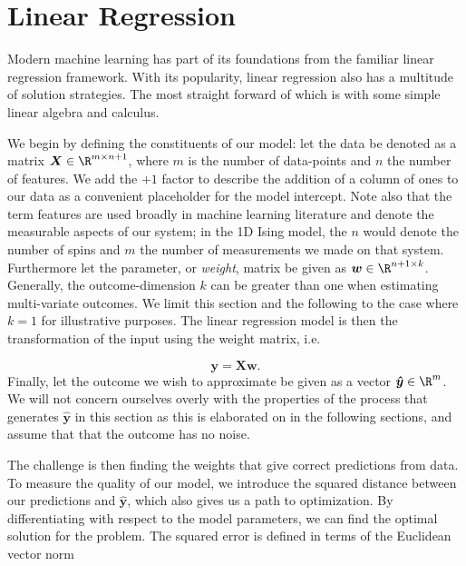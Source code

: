 
\section{Linear Regression}\label{sec:LinReg}

Modern machine learning has part of its foundations from the familiar linear regression framework. With its popularity, linear regression also has a multitude of solution strategies. The most straight forward of which is with some simple linear algebra and calculus.

We begin by defining the constituents of our model: let the data be denoted as a matrix $\boldsymbol{X} \in \R^{m\times n+1}$, where $m$ is the number of data-points and $n$ the number of features. We add the $+1$ factor to describe the addition of a column of ones to our data as a convenient placeholder for the model intercept. Note also that the term features are used broadly in machine learning literature and denote the measurable aspects of our system; in the 1D Ising model, the $n$ would denote the number of spins and $m$ the number of measurements we made on that system. Furthermore let the parameter, or \textit{weight}, matrix be given as $\boldsymbol{w} \in \R^{n + 1\times k}$. Generally, the outcome-dimension $k$ can be greater than one when estimating multi-variate outcomes. We limit this section and the following to the case where $k=1$ for illustrative purposes. The linear regression model is then the transformation of the input using the weight matrix, i.e. 

\begin{equation}\label{eq:og_linreg}
\boldsymbol{y} = \boldsymbol{X}\boldsymbol{w}.
\end{equation}
\noindent Finally, let the outcome we wish to approximate be given as a vector $\boldsymbol{\hat{y}} \in \R^m$. We will not concern ourselves overly with the properties of the process that generates $\boldsymbol{\hat{y}}$ in this section as this is elaborated on in the following sections, and assume that that the outcome has no noise.

The challenge is then finding the weights that give correct predictions from data. To measure the quality of our model, we introduce the squared distance between our predictions and $\boldsymbol{\hat{y}}$, which also gives us a path to optimization. By differentiating with respect to the model parameters, we can find the optimal solution for the problem. The squared error is defined in terms of the Euclidean vector norm  

